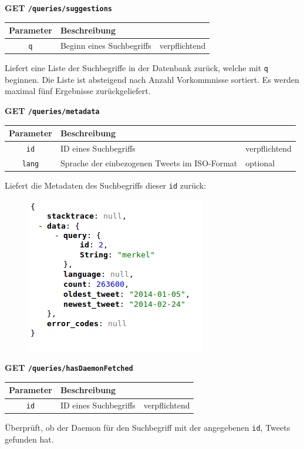 \noindent
\textbf{GET \texttt{/queries/suggestions}}
\begin{table}[h!]
\begin{tabular}{| c | p{\tweite} | l |}
\hline
	\textbf{Parameter} & \textbf{Beschreibung} &  \\
\hline \hline
 	\texttt{q} & Beginn eines Suchbegriffs & verpflichtend \\
\hline
\end{tabular}
\end{table}
\newline
Liefert eine Liste der Suchbegriffe in der Datenbank zurück, welche mit \texttt{q} beginnen. Die Liste ist absteigend nach Anzahl Vorkommnisse sortiert. Es werden maximal fünf Ergebnisse zurückgeliefert.
\newpage

\noindent
\textbf{GET \texttt{/queries/metadata}}
\begin{table}[h!]
\begin{tabular}{| c | p{\tweite} | l |}
\hline
	\textbf{Parameter} & \textbf{Beschreibung} &  \\
\hline \hline
 	\texttt{id} & ID eines Suchbegriffs & verpflichtend \\
\hline
 	\texttt{lang} & Sprache der einbezogenen Tweets im ISO-Format & optional \\
\hline
\end{tabular}
\end{table}
\newline
Liefert die Metadaten des Suchbegriffs dieser \texttt{id} zurück:
\begin{figure}[h!]
\includegraphics[scale=0.6]{Bilder/RestApi/queriesMetadata.png}
\end{figure}

\noindent
\textbf{GET \texttt{/queries/hasDaemonFetched}}
\begin{table}[h!]
\begin{tabular}{| c | p{\tweite} | l |}
\hline
	\textbf{Parameter} & \textbf{Beschreibung} &  \\
\hline \hline
 	\texttt{id} & ID eines Suchbegriffs & verpflichtend \\
\hline
\end{tabular}
\end{table}
\newline
Überprüft, ob der Daemon für den Suchbegriff mit der angegebenen \texttt{id}, Tweets gefunden hat.
\newpage


